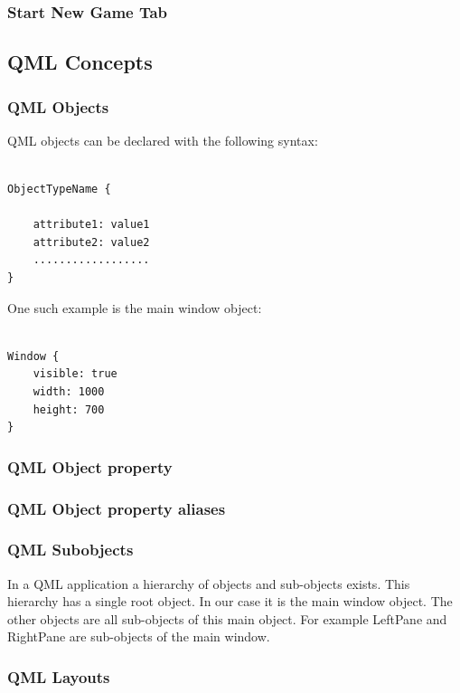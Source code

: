 \subsubsection {Start New Game Tab}

\subsection {QML Concepts}

\subsubsection {QML Objects}

QML objects can be declared with the following syntax: 

\begin{lstlisting}

ObjectTypeName {

	attribute1: value1
	attribute2: value2
	..................
}

\end{lstlisting}

One such example is the main window object:

\begin{lstlisting}

Window {
	visible: true
	width: 1000
	height: 700
}

\end{lstlisting}

\subsubsection {QML Object property}
\subsubsection {QML Object property aliases}
\subsubsection {QML Subobjects}

In a QML application a hierarchy of objects and sub-objects exists. This hierarchy has a single root object. In our case it is the main window object. The other objects are all sub-objects of this main object. 
For example LeftPane and RightPane are sub-objects of the main window. 

\subsubsection {QML Layouts}

